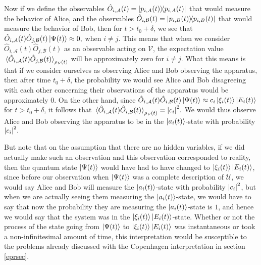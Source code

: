     Now if we define the observables $\hat{O}_{i,\mathcal{A}}(t)=\dyad{p_{i,A}(t)}$ that would measure the behavior of Alice, and the observables $\hat{O}_{i,\mathcal{B}}(t)=\dyad{p_{i,B}(t)}$ that would measure the behavior of Bob, then for $t>t_0+\delta$, we see that $\hat{O}_{i,\mathcal{A}}(t)\hat{O}_{j,\mathcal{B}}(t)\ket{\Psi(t)}\approx 0,$ when $i\neq j$. This means that when we consider $\hat{O}_{i,\mathcal{A}}(t)\hat{O}_{j,\mathcal{B}}(t)$ as an observable acting on $\mathcal{V}$,  the expectation value $\ev*{\hat{O}_{i,\mathcal{A}}(t)\hat{O}_{j,\mathcal{B}}(t)}_{\rho_\mathcal{V}(t)}$ will be approximately zero for $i\neq j$. What this means is that if we consider ourselves as observing Alice and Bob observing the apparatus, then after time $t_0+\delta$, the probability we would see Alice and Bob disagreeing with each other concerning their observations of the apparatus would be approximately 0. 
     On the other hand, since $\hat{O}_{i,\mathcal{A}}(t)\hat{O}_{i,\mathcal{B}}(t)\ket{\Psi(t)} \approx c_i \ket{\xi_i(t)}\ket{E_i(t)}$ for $t>t_0+\delta$, it follows that $\ev*{\hat{O}_{i,\mathcal{A}}(t)\hat{O}_{i,\mathcal{B}}(t)}_{\rho_\mathcal{V}(t)}=\abs{c_i}^2.$ 
     We would thus observe Alice and Bob observing the apparatus to be in the $\ket{a_i(t)}$-state with probability $\abs{c_i}^2.$ 
     
     But note that on the assumption that there are no hidden variables, if we did actually make such an observation and this observation corresponded to reality, then the quantum state $\ket{\Psi(t)}$ would have had to have changed to $\ket{\xi_i(t)}\ket{E_i(t)}$, since before our observation when $\ket{\Psi(t)}$ was a complete description of $\mathcal{U}$, we would say Alice and Bob will measure the $\ket{a_i(t)}$-state with probability $\abs{c_i}^2$, but when we are actually seeing them measuring the $\ket{a_i(t)}$-state, we would have to say that now the probability they are measuring the $\ket{a_i(t)}$-state is $1$, and hence we would say that the system was in the $\ket{\xi_i(t)}\ket{E_i(t)}$-state. Whether or not the process of the state going from $\ket{\Psi(t)}$ to $\ket{\xi_i(t)}\ket{E_i(t)}$ was instantaneous or took a non-infinitesimal amount of time, this interpretation would be susceptible to the problems already discussed with the Copenhagen interpretation in section \ref{eprsec}.
    
